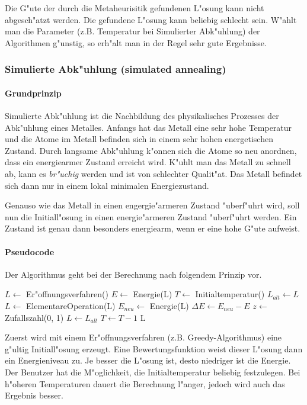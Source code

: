 Die G"ute der durch die Metaheurisitik gefundenen L"osung kann nicht abgesch"atzt werden. Die gefundene L"osung kann beliebig schlecht sein. W"ahlt man die Parameter (z.B. Temperatur bei Simulierter Abk"uhlung) der Algorithmen g"unstig, so erh"alt man in der Regel sehr gute Ergebnisse.

\subsubsection{Simulierte Abk"uhlung (simulated annealing)}
\paragraph{Grundprinzip}
Simulierte Abk"uhlung ist die Nachbildung des physikalisches Prozesses der Abk"uhlung eines Metalles. Anfangs hat das Metall eine sehr hohe Temperatur und die Atome im Metall befinden sich in einem sehr hohen energetischen Zustand. Durch langsame Abk"uhlung k"onnen sich die Atome so neu anordnen, dass ein energiearmer Zustand erreicht wird. K"uhlt man das Metall zu schnell ab, kann es \emph{br"uchig} werden und ist von schlechter Qualit"at. Das Metall befindet sich dann nur in einem lokal minimalen Energiezustand.

Genauso wie das Metall in einen engergie"armeren Zustand "uberf"uhrt wird, soll nun die Initiall"osung in einen energie"armeren Zustand "uberf"uhrt werden. Ein Zustand ist genau dann besonders energiearm, wenn er eine hohe G"ute aufweist. 

\paragraph{Pseudocode}
Der Algorithmus geht bei der Berechnung nach folgendem Prinzip vor.

\begin{algorithmic}
\STATE $L \gets$ Er"offnungsverfahren()
\STATE $E \gets$ Energie(L)
\STATE $T \gets$ Initialtemperatur()
\newline
{}
		\STATE $L_{alt} \gets L$
			\STATE $L \gets$ ElementareOperation(L)
		\ENDFOR
		\newline
		\STATE $E_{neu} \gets$ Energie(L)
		\STATE $\Delta E \gets E_{neu} - E$
		\newline
			\STATE $z \gets$ Zufallszahl(0, 1)
				\STATE $L \gets L_{alt}$
			\ENDIF
		\ENDIF
	\ENDFOR
	\newline
	\STATE $T \gets T-1$
\ENDWHILE
\RETURN L
\end{algorithmic}
Zuerst wird mit einem Er"offnungsverfahren (z.B. Greedy-Algorithmus) eine g"ultig Initiall"osung erzeugt. Eine Bewertungsfunktion weist dieser L"osung dann ein Energieniveau zu. Je besser die L"osung ist, desto niedriger ist die Energie. Der Benutzer hat die M"oglichkeit, die Initialtemperatur beliebig festzulegen. Bei h"oheren Temperaturen dauert die Berechnung l"anger, jedoch wird auch das Ergebnis besser.

